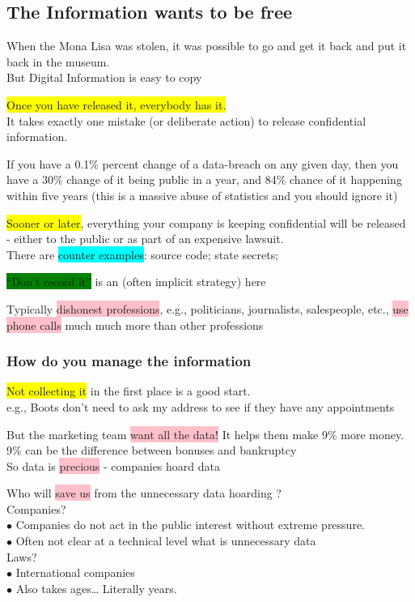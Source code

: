 \documentclass[tikz,border=10pt]{project_plan}
\newcommand{\bulletPoint}{\hspace{-3.1pt}$\bullet$ \hspace{5pt}}
\begin{document}
\subsection{The Information wants to be free}

When the Mona Lisa was stolen, it was possible to go and get it back and put it back in the museum.\\
But Digital Information is easy to copy

\colorbox{yellow}{Once you have released it, everybody has it.} \\
It takes exactly one mistake (or deliberate action) to release confidential information.

If you have a 0.1\% percent change of a data-breach on any given day, then you
have a 30\% change of it being public in a year, and 84\% chance of it happening
within five years (this is a massive abuse of statistics and you should ignore it)

\colorbox{yellow}{Sooner or later}, everything your company is keeping confidential will be released\\
- either to the public or as part of an expensive lawsuit. \\
There are \colorbox{cyan}{counter examples}: source code; state secrets;

\colorbox{green}{“Don’t record it”} is an (often implicit strategy) here

Typically \colorbox{pink}{dishonest professions}, e.g., politicians, journalists, salespeople, etc.,
\colorbox{pink}{use phone calls} much much more than other professions

\subsubsection{How do you manage the information}

\colorbox{yellow}{Not collecting it} in the first place is a good start.\\
e.g., Boots don’t need to ask my address to see if they have any appointments

But the marketing team \colorbox{pink}{want all the data!} It helps them make 9\% more money. \\
9\% can be the difference between bonuses and bankruptcy\\
So data is \colorbox{pink}{precious} - companies hoard data

Who will \colorbox{pink}{save us} from the unnecessary data hoarding ?\\
Companies? \\
\bulletPoint Companies do not act in the public interest without extreme pressure. \\
\bulletPoint Often not clear at a technical level what is unnecessary data \\
Laws? \\
\bulletPoint International companies\\
\bulletPoint Also takes ages… Literally years.
\end{document}

